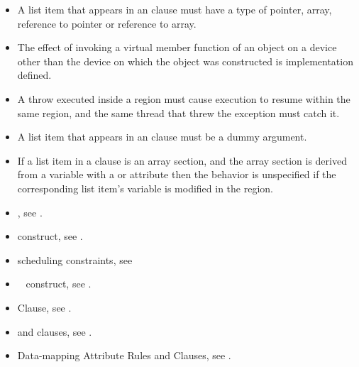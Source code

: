 {{{\begin{itemize}
\cppspecificstart
\item A list item that appears in an  clause must have a type
  of pointer, array, reference to pointer or reference to array.
\item The effect of invoking a virtual member function of an object on a device other than the device on which the object was constructed is implementation defined. 
\item A throw executed inside a  region must cause execution to resume within the
same  region, and the same thread that threw the exception must catch it. 
\cppspecificend

\fortranspecificstart
\item A list item that appears in an  clause must be a dummy
  argument.
\item If a list item in a  clause is an array section, and the array section is derived from a variable with a  or  attribute then the behavior is unspecified if the corresponding list item's variable is modified in the region.
\fortranspecificend
\end{itemize}

\crossreferences
\begin{itemize}
\item {}, see 
. 

\item {} construct, see 
.

\item {} scheduling constraints, see 

\item {}~ construct, see 
.

\item {} Clause, see .

\item {} and  clauses, see 
.

\item Data-mapping Attribute Rules and Clauses, see 
.
\end{itemize}







}}}
